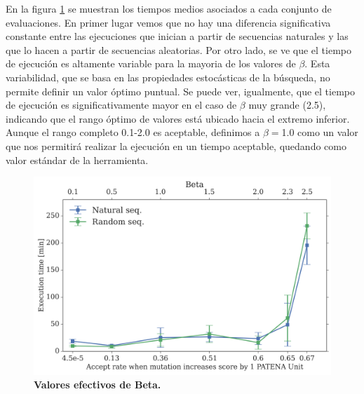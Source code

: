 En la figura \ref{fig:beta-vs-time} se muestran los tiempos medios asociados a cada conjunto de evaluaciones.
En primer lugar vemos que no hay una diferencia significativa constante entre las ejecuciones que inician a partir de secuencias naturales y las que lo hacen a partir de secuencias aleatorias.
Por otro lado, se ve que el tiempo de ejecución es altamente variable para la mayoria de los valores de $\beta$.
Esta variabilidad, que se basa en las propiedades estocásticas de la búsqueda, no permite definir un valor óptimo puntual. Se puede ver, igualmente, que el tiempo de ejecución es significativamente mayor en el caso de $\beta$ muy grande (2.5), 
indicando que el rango óptimo de valores está ubicado hacia el extremo inferior.
Aunque el rango completo 0.1-2.0 es aceptable, definimos a $\beta=$1.0 como un valor que nos permitirá realizar la ejecución en un tiempo aceptable, quedando como valor estándar de la herramienta.



\begin{figure}[htbp]
\includegraphics[width=\textwidth]{img/resultados/beta-vs-time-length50-300dpi.png}
\caption{\textbf{Valores efectivos de Beta.}}
\label{fig:beta-vs-time}
\end{figure}















